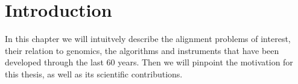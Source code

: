 \graphicspath{{\dir/}}


\chapter*{Introduction} \label{ch:introduction}

In this chapter we will intuitvely describe the alignment problems of interest,
their relation to genomics, the algorithms and instruments that have been
developed through the last 60 years. Then we will pinpoint the motivation for
this thesis, as well as its scientific contributions.





